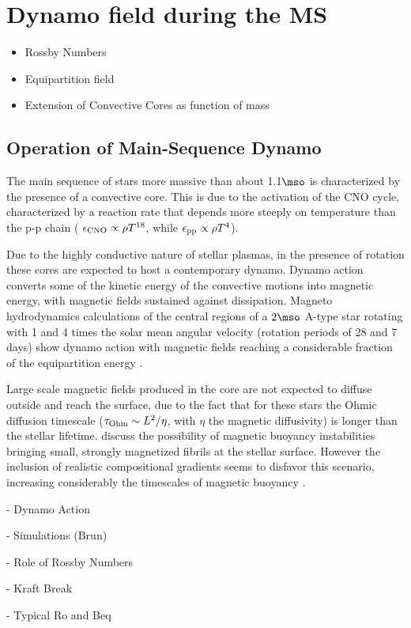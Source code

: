 
  \section{Dynamo field during the MS}
\begin{itemize}
\item Rossby Numbers
\item Equipartition field
\item Extension of Convective Cores as function of mass
\end{itemize}


\subsection{Operation of Main-Sequence Dynamo}
The main sequence of stars more massive than about 1.1$\mso$ is characterized by the presence of a convective core.
This is due to the activation of the CNO cycle, characterized by a reaction rate that depends more steeply on temperature than the p-p chain ( $\epsilon_{\rm CNO}\propto \rho T^{18}$, while  $\epsilon_{\rm pp}\propto \rho T^{4}$).

Due to the highly conductive nature of stellar plasmas, in the presence of rotation
these cores are expected to host a contemporary dynamo. Dynamo action converts some of the kinetic energy 
of the convective motions into magnetic energy, with magnetic fields sustained against dissipation.
Magneto hydrodynamics calculations of the central regions of a  $2\mso$ A-type star rotating with 
1 and 4 times the solar mean angular velocity (rotation periods of 28 and 7 days) show dynamo action 
with magnetic fields reaching a considerable fraction of the equipartition energy \citep{Brun_2005}.

Large scale magnetic fields produced in the core are not expected to diffuse outside and reach the surface, due to the fact that for these stars the Ohmic diffusion timescale ($\tau_{\rm Ohm}\sim L^2/\eta$, with $\eta$ the magnetic diffusivity) is longer than the stellar lifetime. \citet{MacGregor_2003} discuss the possibility of magnetic buoyancy instabilities bringing small, strongly magnetized fibrils at the stellar surface. However the inclusion of realistic compositional gradients seems to disfavor this scenario, increasing considerably the timescales of magnetic buoyancy \cite{MacDonald_2004}.  



- Dynamo Action

- Simulations (Brun)

- Role of Rossby Numbers

- Kraft Break
  
- Typical Ro and Beq   
  
  
  